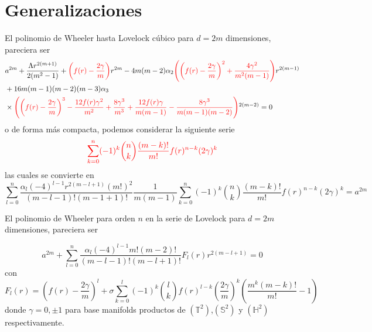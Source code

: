 \newpage
\section{Generalizaciones}
El polinomio de Wheeler hasta Lovelock cúbico para $d=2m$ dimensiones, pareciera ser
\begin{equation*}
\begin{split}
    &a^{2m}+\frac{\Lambda r^{2(m+1)}}{2(m^2-1)}+\textcolor{red}{\left(f(r)-\frac{2\gamma}{m}\right)}r^{2m}-4m(m-2)\alpha_2\textcolor{red}{\left(\left(f(r)-\frac{2\gamma}{m}\right)^2+\frac{4\gamma^2}{m^2(m-1)}\right)}r^{2(m-1)}\\
    &+16m(m-1)(m-2)(m-3)\alpha_3\\
    &\times\textcolor{red}{\left(\left(f(r)-\frac{2\gamma}{m}\right)^3-\frac{12f(r)\gamma^2}{m^2}+\frac{8\gamma^3}{m^3}+\frac{12f(r)\gamma}{m(m-1)}-\frac{8\gamma^3}{m(m-1)(m-2)}\right)}^{2(m-2)}=0
\end{split}
\end{equation*}
o de forma más compacta, podemos considerar la siguiente serie
\begin{equation}
    \textcolor{red}{\sum_{k=0}^n(-1)^k\binom{n}{k}\frac{(m-k)!}{m!}f(r)^{n-k}(2\gamma)^k}
\end{equation}
las cuales se convierte en 
\begin{equation*}
    \sum_{l=0}^n\frac{\alpha_l(-4)^{l-1}r^{2(m-l+1)}(m!)^2}{(m-l-1)!(m-1+1)!}\frac{1}{m(m-1)}\sum_{k=0}^n(-1)^k\binom{n}{k}\frac{(m-k)!}{m!}f(r)^{n-k}(2\gamma)^k=a^{2m}
\end{equation*}

El polinomio de Wheeler para orden $n$ en la serie de Lovelock para $d=2m$ dimensiones, pareciera ser
\begin{tcolorbox}
\begin{equation*}
   a^{2m} +\sum_{l=0}^{n}\frac{\alpha_l(-4)^{l-1}m!(m-2)!}{(m-l-1)!(m-l+1)!}F_l(r)r^{2(m-l+1)}=0
\end{equation*}
con
\begin{equation*}
    F_l(r)=\left(f(r)-\frac{2\gamma}{m}\right)^l+\sigma \sum_{k=0}^l(-1)^k\binom{l}{k}f(r)^{l-k}\left(\frac{2\gamma}{m}\right)^k\left(\frac{m^k(m-k)!}{m!}-1\right)
\end{equation*}
donde $\gamma=0,\pm 1$ para base manifolds productos de $(\mathbb{T}^2)$,$(\mathbb{S}^2)$ y $(\mathbb{H}^2)$ respectivamente.
\end{tcolorbox}

